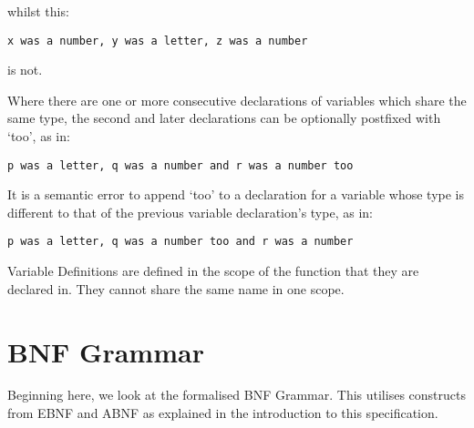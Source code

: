 \documentclass[a4wide, 11pt]{article}
\begin{document}
whilst this:

\begin{verbatim}
x was a number, y was a letter, z was a number
\end{verbatim}

is not.

Where there are one or more consecutive declarations of variables which share the same type, the second and later declarations can be optionally postfixed with `too', as in:

\begin{verbatim}
p was a letter, q was a number and r was a number too
\end{verbatim}

It is a semantic error to append `too' to a declaration for a variable whose type is different to that of the previous variable declaration's type, as in:

\begin{verbatim}
p was a letter, q was a number too and r was a number
\end{verbatim}

Variable Definitions are defined in the scope of the function that they are declared in. They cannot share the same name in one scope.

\section{BNF Grammar} 

Beginning here, we look at the formalised BNF Grammar. This utilises constructs from EBNF and ABNF as explained in the introduction to this specification.
\end{document}
